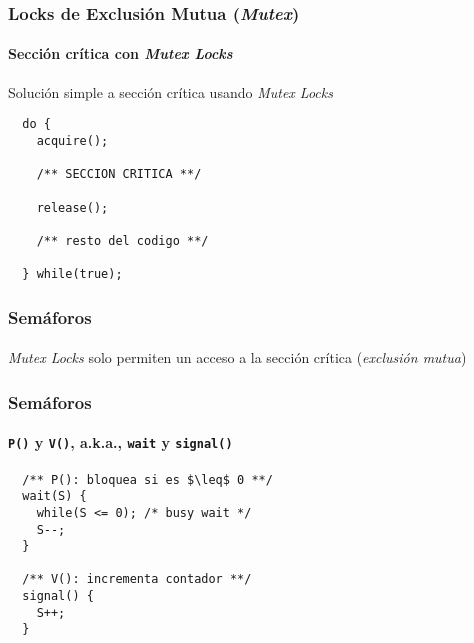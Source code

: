 \documentclass[letter]{beamer}
\begin{document}
\begin{frame}[fragile]
  \frametitle{Locks de Exclusión Mutua ({\em Mutex}) }
  \framesubtitle{Sección crítica con {\em Mutex Locks}}

  Solución simple a sección crítica usando {\em Mutex Locks}

\begin{verbatim}
  do {
    acquire();
    
    /** SECCION CRITICA **/
    
    release();
    
    /** resto del codigo **/

  } while(true);
\end{verbatim}  
  

\end{frame}
\begin{frame}
  \frametitle{Semáforos}
  \framesubtitle{}

  {\em Mutex Locks} solo permiten un acceso a la sección crítica ({\em exclusión mutua})
  


\end{frame}

\begin{frame}[fragile]
  \frametitle{Semáforos}
  \framesubtitle{{\tt P()} y {\tt V()}, a.k.a., {\tt wait} y {\tt signal()}}

\begin{verbatim}
  /** P(): bloquea si es $\leq$ 0 **/
  wait(S) {
    while(S <= 0); /* busy wait */
    S--;
  }

  /** V(): incrementa contador **/
  signal() {
    S++;
  }
\end{verbatim}

\end{frame}
\end{document}
